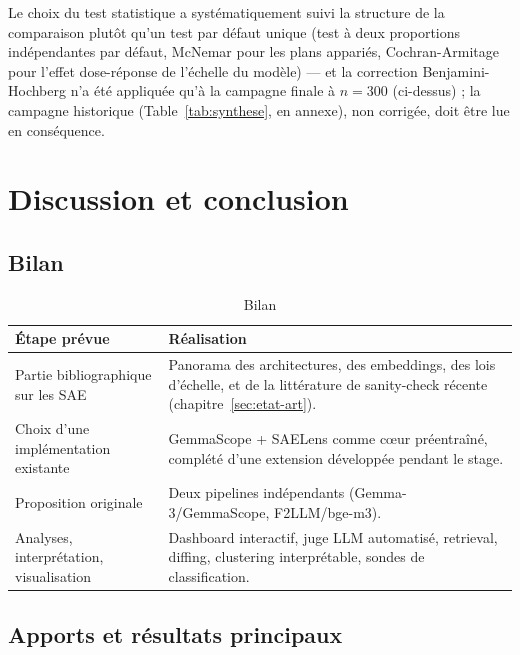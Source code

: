 \documentclass[11pt]{article}
\begin{document}
Le choix du test statistique a systématiquement suivi la structure de la
comparaison plutôt qu'un test par défaut unique (test à deux proportions
indépendantes par défaut, McNemar pour les plans appariés, Cochran-Armitage
pour l'effet dose-réponse de l'échelle du modèle) --- et la correction
Benjamini-Hochberg n'a été appliquée qu'à la campagne finale à $n=300$
(ci-dessus) ; la campagne historique (Table~\ref{tab:synthese}, en annexe),
non corrigée, doit être lue en conséquence.

\newpage

\section{Discussion et conclusion}
\label{sec:discussion}

\subsection{Bilan}

\begin{table}[h!]
\centering
\caption{Bilan}
\vspace{0.4em}\small
\begin{tabular}{@{}p{5.5cm}p{8.5cm}@{}}
\toprule
\textbf{Étape prévue} & \textbf{Réalisation} \\ \midrule
Partie bibliographique sur les SAE & Panorama des
  architectures, des embeddings, des lois d'échelle, et de la littérature de
  sanity-check récente (chapitre~\ref{sec:etat-art}). \\
Choix d'une implémentation existante & GemmaScope + SAELens comme cœur
  préentraîné, complété d'une extension développée pendant le stage. \\
Proposition originale & Deux pipelines indépendants
  (Gemma-3/GemmaScope, F2LLM/bge-m3). \\
Analyses, interprétation, visualisation & Dashboard interactif, juge LLM
  automatisé, retrieval, diffing, clustering interprétable, sondes de
  classification. \\
\bottomrule
\end{tabular}
\end{table}

\subsection{Apports et résultats principaux}
\end{document}
